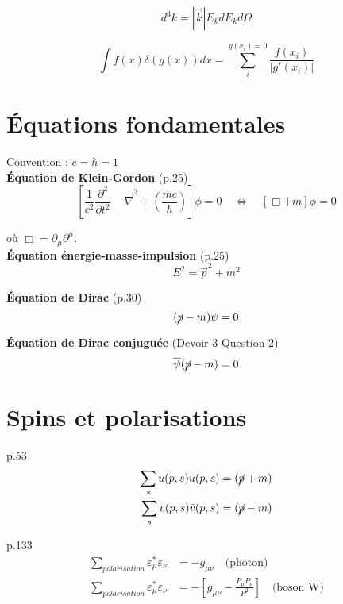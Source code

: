 \documentclass[12pt]{article}
\begin{document}
\begin{equation}
  d^3 k = |\vec{k}| E_k dE_k d\Omega
\end{equation}

\begin{equation}
  \int f(x) \delta(g(x)) dx = \sum_i^{g(x_i)=0} \frac{f(x_i)}{|g'(x_i)|}
\end{equation}

\section{Équations fondamentales}
Convention : $c=\hbar=1$ \\

\textbf{Équation de Klein-Gordon} (p.25)
\begin{equation}
    \left[\frac{1}{c^2}\frac{\partial^2}{\partial t^2} - \Vec{\nabla}^2 + \left(\frac{mc}{\hbar}\right)\right]\phi = 0 \quad \iff \quad [\Box + m] \phi = 0
\end{equation}

où $\Box = \partial_\mu\partial^\mu$.\\

\textbf{Équation énergie-masse-impulsion} (p.25)
\begin{equation}
    E^2 = \Vec{p}^2 + m^2
\end{equation}

\textbf{Équation de Dirac} (p.30)
\begin{equation}
    (\cancel{p} -m )\psi = 0
\end{equation}

\textbf{Équation de Dirac conjuguée} (Devoir 3 Question 2)
\begin{equation}
    \overline{\psi}(\cancel{p} -m ) = 0
\end{equation}


\section{Spins et polarisations}
p.53
\begin{align}
    \sum_s u(p,s)\Bar{u}(p,s) &= (\cancel{p}+m)\\
    \sum_s v(p,s)\Bar{v}(p,s) &= (\cancel{p}-m)
\end{align}

p.133 \\
\begin{align}
  \sum_{polarisation} \varepsilon_\mu^*\varepsilon_\nu &= - g_{\mu\nu} \quad \text{(photon)}\\
  \sum_{polarisation} \varepsilon_\mu^*\varepsilon_\nu &= - \left[g_{\mu\nu}- \frac{P_\mu P_\nu}{P^2}\right] \quad \text{(boson W)}
\end{align}
\end{document}
